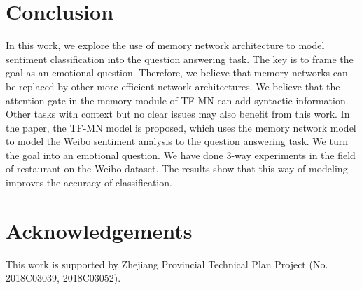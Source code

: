 \documentclass[runningheads, twocolumn]{llncs}
\begin{document}
\section{Conclusion}

In this work, we explore the use of memory network architecture to model sentiment classification into the question answering task. The key is to frame the goal as an emotional question. Therefore, we believe that memory networks can be replaced by other more efficient network architectures. We believe that the attention gate in the memory module of TF-MN can add syntactic information. Other tasks with context but no clear issues may also benefit from this work. In the paper, the TF-MN model is proposed, which uses the memory network model to model the Weibo sentiment analysis to the question answering task. We turn the goal into an emotional question. We have done 3-way experiments in the field of restaurant on the Weibo dataset. The results show that this way of modeling improves the accuracy of classification.

\section{Acknowledgements}

This work is supported by Zhejiang Provincial Technical Plan Project (No. 2018C03039, 2018C03052).


\end{document}
